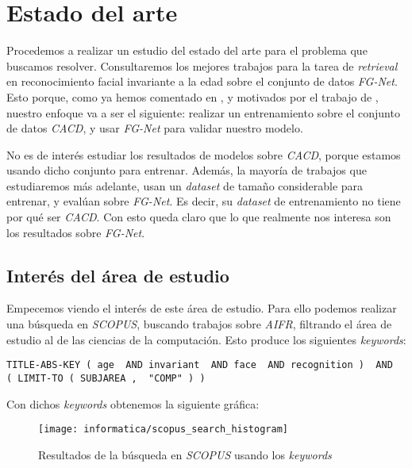 \chapter{Estado del arte} \label{ich:estado_arte}

Procedemos a realizar un estudio del estado del arte para el problema que buscamos resolver. Consultaremos los mejores trabajos para la tarea de \textit{retrieval} en reconocimiento facial invariante a la edad sobre el conjunto de datos \textit{FG-Net}. Esto porque, como ya hemos comentado en , y motivados por el trabajo de \cite{informatica:best_fgnet_model}, nuestro enfoque va a ser el siguiente: realizar un entrenamiento sobre el conjunto de datos \textit{CACD}, y usar \textit{FG-Net} para validar nuestro modelo.

No es de interés estudiar los resultados de modelos sobre \textit{CACD}, porque estamos usando dicho conjunto para entrenar. Además, la mayoría de trabajos que estudiaremos más adelante, usan un \textit{dataset} de tamaño considerable para entrenar, y evalúan sobre \textit{FG-Net}. Es decir, su \textit{dataset} de entrenamiento no tiene por qué ser \textit{CACD}. Con esto queda claro que lo que realmente nos interesa son los resultados sobre \textit{FG-Net}.

\section{Interés del área de estudio} \label{isec:interesareaestudio}

Empecemos viendo el interés de este área de estudio. Para ello podemos realizar una búsqueda en \textit{SCOPUS}, buscando trabajos sobre \textit{AIFR}, filtrando el área de estudio al de las ciencias de la computación. Esto produce los siguientes \textit{keywords}:

\begin{lstlisting}[caption=\textit{Keywords usados para la búsqueda en \textit{SCOPUS}. Búsqueda realizada el 17 de Septiembre de 2023}, label=code:scopus_search, captionpos=b]
    TITLE-ABS-KEY ( age  AND invariant  AND face  AND recognition )  AND  ( LIMIT-TO ( SUBJAREA ,  "COMP" ) )
\end{lstlisting}

Con dichos \textit{keywords} obtenemos la siguiente gráfica:

\begin{figure}[H]
    \centering
    \texttt{[image: informatica/scopus\_search\_histogram]}
    \caption{Resultados de la búsqueda en \textit{SCOPUS} usando los \textit{keywords} }
\end{figure}

